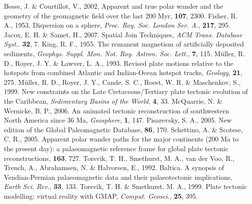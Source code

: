 \begin{thebibliography}{}
  Besse, J. \& Courtillot, V., 2002, Apparent and true polar wander and the
  geometry of the geomagnetic field over the last 200 Myr, \jgr{}\textbf{107},
  2300.
  Fisher, R. A., 1953. Dispersion on a sphere, \textit{Proc. Roy. Soc. London
  Ser. A.}, \textbf{217}, 295.
  Jacox, E. H. \& Samet, H., 2007. Spatial Join Techniques, \textit{ACM Trans.
  Database Syst.}. \textbf{32}, 7.
  King, R. F., 1955. The remanent magnetism of artificially deposited sediments,
  \textit{Geophys. Suppl. Mon. Not. Roy. Astron. Soc. Lett.}, \textbf{7},
  115.
  M{\"{u}}ller, R. D., Royer, J. Y. \& Lawver, L. A., 1993. Revised plate
  motions relative to the hotspots from combined Atlantic and Indian-Ocean
  hotspot tracks, \textit{Geology}, \textbf{21}, 275.
  M{\"{u}}ller, R. D., Royer, J. Y., Cande, S. C., Roest, W. R. \& Maschenkov,
  S., 1999. New constraints on the Late Cretaceous/Tertiary plate tectonic
  evolution of the Caribbean, \textit{Sedimentary Basins of the World}.
  \textbf{4}, 33.
  McQuarrie, N. \& Wernicke, B. P., 2006. An animated tectonic reconstruction of
  southwestern North America since 36 Ma, \textit{Geosphere}, \textbf{1},
  147.
  Pisarevsky, S. A., 2005. New edition of the Global Paleomagnetic Database,
  \eos{}\textbf{86}, 170.
  Schettino, A. \& Scotese, C. R., 2005. Apparent polar wander paths for the
  major continents (200 Ma to the present day): a palaeomagnetic reference frame
  for global plate tectonic reconstructions, \gji{}\textbf{163},
  727.
  Torsvik, T. H., Smethurst, M. A., van der Voo, R., Trench, A., Abrahamsen, N.
  \& Halvorsen, E., 1992. Baltica. A synopsis of Vendian-Permian palaeomagnetic
  data and their palaeotectonic implications, \textit{Earth Sci. Rev.},
  \textbf{33}, 133.
  Torsvik, T. H. \& Smethurst, M. A., 1999. Plate tectonic modelling: virtual
  reality with GMAP, \textit{Comput. Geosci.}, \textbf{25}, 395.

\end{thebibliography}
